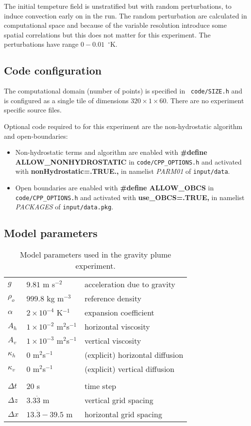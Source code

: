 The initial tempeture field is unstratified but with random
perturbations, to induce convection early on in the run. The random
perturbation are calculated in computational space and because of the
variable resolution introduce some spatial correlations but this does
not matter for this experiment. The perturbations have range
$0-0.01$~$^\circ$K.

\subsection{Code configuration}
\label{sect:plume-config}

The computational domain (number of points) is specified in {\tt
code/SIZE.h} and is configured as a single tile of dimensions
$320\times1\times60$. There are no experiment specific source files.

Optional code required to for this experiment are the non-hydrostatic
algorithm and open-boundaries:
\begin{itemize}
\item Non-hydrostatic terms and algorithm are enabled with {\bf
\#define ALLOW\_NONHYDROSTATIC} in {\tt code/CPP\_OPTIONS.h} and
activated with {\bf nonHydrostatic=.TRUE.,} in namelist {\em PARM01}
of {\tt input/data}.
\item Open boundaries are enabled with {\bf \#define ALLOW\_OBCS} in
{\tt code/CPP\_OPTIONS.h} and activated with {\bf use\_OBCS=.TRUE,} in
namelist {\em PACKAGES} of {\tt input/data.pkg}.
\end{itemize}

\subsection{Model parameters}
\label{sect:plume-params}

\begin{table}
\begin{center}
\begin{tabular}{lll}
$g$ & $9.81$ m s$^{-2}$ & acceleration due to gravity \\
$\rho_o$ & $999.8$ kg m$^{-3}$ & reference density \\
$\alpha$ & $2 \times 10^{-4}$ K$^{-1}$ & expansion coefficient \\
$A_h$ & $1 \times 10^{-2}$ m$^2$s$^{-1}$ & horizontal viscosity \\
$A_v$ & $1 \times 10^{-3}$ m$^2$s$^{-1}$ & vertical viscosity \\
$\kappa_h$ & $0$ m$^2$s$^{-1}$ & (explicit) horizontal diffusion \\
$\kappa_v$ & $0$ m$^2$s$^{-1}$ & (explicit) vertical diffusion \\
\\
$\Delta t$ & $20$ s & time step \\
$\Delta z$ & $3.3\dot{3}$ m & vertical grid spacing \\
$\Delta x$ & $13.\dot{3}-39.5$ m & horizontal grid spacing
\end{tabular}
\end{center}
\caption{Model parameters used in the gravity plume experiment.}
\label{table:plume-on-slope}
\end{table}

